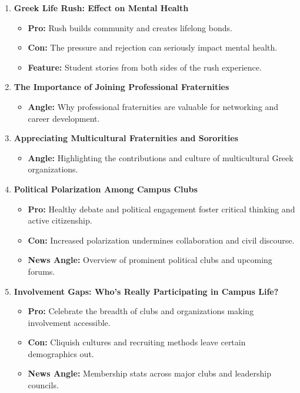 \documentclass{article}
\begin{document}
\begin{enumerate}[leftmargin=*]
    \item \textbf{Greek Life Rush: Effect on Mental Health}
    \begin{itemize}
        \item \textbf{Pro:} Rush builds community and creates lifelong bonds.
        \item \textbf{Con:} The pressure and rejection can seriously impact mental health.
        \item \textbf{Feature:} Student stories from both sides of the rush experience.
    \end{itemize}

    \item \textbf{The Importance of Joining Professional Fraternities}
    \begin{itemize}
        \item \textbf{Angle:} Why professional fraternities are valuable for networking and career development.
    \end{itemize}

    \item \textbf{Appreciating Multicultural Fraternities and Sororities}
    \begin{itemize}
        \item \textbf{Angle:} Highlighting the contributions and culture of multicultural Greek organizations.
    \end{itemize}

    \item \textbf{Political Polarization Among Campus Clubs}
    \begin{itemize}
        \item \textbf{Pro:} Healthy debate and political engagement foster critical thinking and active citizenship.
        \item \textbf{Con:} Increased polarization undermines collaboration and civil discourse.
        \item \textbf{News Angle:} Overview of prominent political clubs and upcoming forums.
    \end{itemize}

    \item \textbf{Involvement Gaps: Who's Really Participating in Campus Life?}
    \begin{itemize}
        \item \textbf{Pro:} Celebrate the breadth of clubs and organizations making involvement accessible.
        \item \textbf{Con:} Cliquish cultures and recruiting methods leave certain demographics out.
        \item \textbf{News Angle:} Membership stats across major clubs and leadership councils.
    \end{itemize}
\end{enumerate}
\end{document}
